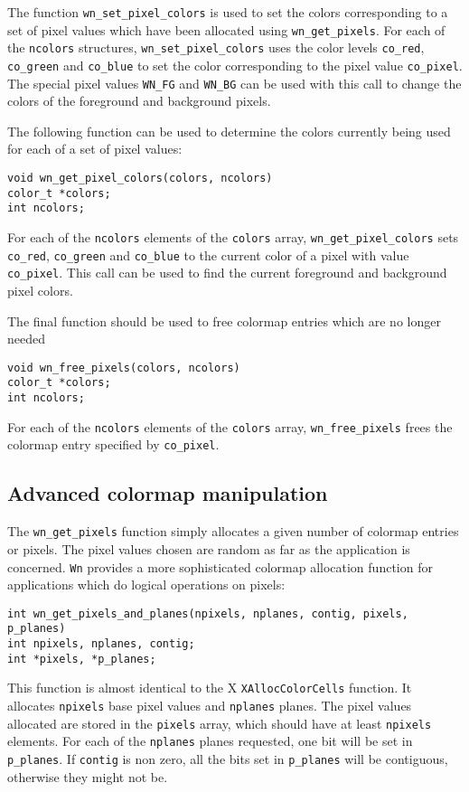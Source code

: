 The function {\tt wn\_set\_pixel\_colors} is used to set the colors
corresponding to a set of pixel values which have been allocated using
{\tt wn\_get\_pixels}.
For each of the {\tt ncolors} structures, {\tt wn\_set\_pixel\_colors} uses the color
levels {\tt co\_red}, {\tt co\_green} and {\tt co\_blue} to set the color
corresponding to the pixel value {\tt co\_pixel}.
The special pixel values {\tt WN\_FG} and {\tt WN\_BG} can be used with this
call to change the colors of the foreground and background pixels.


The following function can be used to determine the colors currently
being used for each of a set of pixel values:
\begin{verbatim}
void wn_get_pixel_colors(colors, ncolors)
color_t *colors;
int ncolors;
\end{verbatim}
For each of the {\tt ncolors} elements of the {\tt colors} array,
{\tt wn\_get\_pixel\_colors} sets {\tt co\_red}, {\tt co\_green} and {\tt co\_blue} to
the current color of a pixel with value {\tt co\_pixel}.
This call can be used to find the current foreground and background pixel
colors.

The final function should be used to free colormap entries
which are no longer needed
\begin{verbatim}
void wn_free_pixels(colors, ncolors)
color_t *colors;
int ncolors;
\end{verbatim}
For each of the {\tt ncolors} elements of the {\tt colors} array,
{\tt wn\_free\_pixels} frees the colormap entry specified by {\tt co\_pixel}.
\subsection {Advanced colormap manipulation}
The {\tt wn\_get\_pixels} function simply allocates a given number of
colormap entries or pixels.  The pixel values chosen are random
as far as the application is concerned.
{\tt Wn} provides a more sophisticated colormap allocation function for
applications which do logical operations on pixels:
\begin{verbatim}
int wn_get_pixels_and_planes(npixels, nplanes, contig, pixels, p_planes)
int npixels, nplanes, contig;
int *pixels, *p_planes;
\end{verbatim}
This function is almost identical to the X {\tt XAllocColorCells} function.
It allocates {\tt npixels} base pixel values and {\tt nplanes} planes.
The pixel values allocated are stored in the {\tt pixels} array, which
should have at least {\tt npixels} elements.
For each of the {\tt nplanes} planes requested, one bit will be set
in {\tt *p\_planes}.
If {\tt contig} is non zero, all the bits set in {\tt *p\_planes} will be
contiguous, otherwise they might not be.

